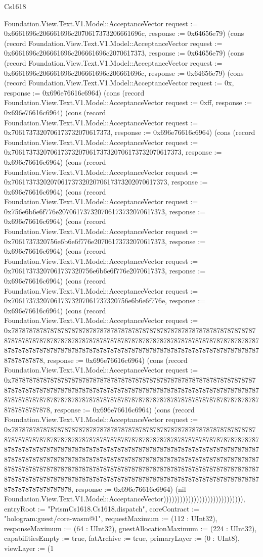 \begin{lexlean}{Cs1618}
\begin{semanticmodule}
{Foundation.View.Text.V1.Model::AcceptanceVector {request := 0x6661696c206661696c2070617373206661696c, response := 0x64656e79}) (cons (record Foundation.View.Text.V1.Model::AcceptanceVector {request := 0x6661696c206661696c206661696c2070617373, response := 0x64656e79}) (cons (record Foundation.View.Text.V1.Model::AcceptanceVector {request := 0x6661696c206661696c206661696c206661696c, response := 0x64656e79}) (cons (record Foundation.View.Text.V1.Model::AcceptanceVector {request := 0x, response := 0x696e76616c6964}) (cons (record Foundation.View.Text.V1.Model::AcceptanceVector {request := 0xff, response := 0x696e76616c6964}) (cons (record Foundation.View.Text.V1.Model::AcceptanceVector {request := 0x7061737320706173732070617373, response := 0x696e76616c6964}) (cons (record Foundation.View.Text.V1.Model::AcceptanceVector {request := 0x706173732070617373207061737320706173732070617373, response := 0x696e76616c6964}) (cons (record Foundation.View.Text.V1.Model::AcceptanceVector {request := 0x70617373202070617373202070617373202070617373, response := 0x696e76616c6964}) (cons (record Foundation.View.Text.V1.Model::AcceptanceVector {request := 0x756e6b6e6f776e207061737320706173732070617373, response := 0x696e76616c6964}) (cons (record Foundation.View.Text.V1.Model::AcceptanceVector {request := 0x7061737320756e6b6e6f776e20706173732070617373, response := 0x696e76616c6964}) (cons (record Foundation.View.Text.V1.Model::AcceptanceVector {request := 0x70617373207061737320756e6b6e6f776e2070617373, response := 0x696e76616c6964}) (cons (record Foundation.View.Text.V1.Model::AcceptanceVector {request := 0x706173732070617373207061737320756e6b6e6f776e, response := 0x696e76616c6964}) (cons (record Foundation.View.Text.V1.Model::AcceptanceVector {request := 0x78787878787878787878787878787878787878787878787878787878787878787878787878787878787878787878787878787878787878787878787878787878787878787878787878787878787878787878787878787878787878787878787878787878787878787878787878787878, response := 0x696e76616c6964}) (cons (record Foundation.View.Text.V1.Model::AcceptanceVector {request := 0x7878787878787878787878787878787878787878787878787878787878787878787878787878787878787878787878787878787878787878787878787878787878787878787878787878787878787878787878787878787878787878787878787878787878787878787878787878787878, response := 0x696e76616c6964}) (cons (record Foundation.View.Text.V1.Model::AcceptanceVector {request := 0x7878787878787878787878787878787878787878787878787878787878787878787878787878787878787878787878787878787878787878787878787878787878787878787878787878787878787878787878787878787878787878787878787878787878787878787878787878787878787878787878787878787878787878787878787878787878787878787878787878787878787878787878787878787878787878787878787878787878787878787878787878787878787878787878787878787878787878787878787878787878787878787878787878787878787878, response := 0x696e76616c6964}) (nil Foundation.View.Text.V1.Model::AcceptanceVector))))))))))))))))))))))))))))), entryRoot := "PrismCs1618.Cs1618.dispatch", coreContract := "hologram:guest/core-wasm@1", requestMaximum := (112 : UInt32), responseMaximum := (64 : UInt32), guestAllocationMaximum := (224 : UInt32), capabilitiesEmpty := true, fatArchive := true, primaryLayer := (0 : UInt8), viewLayer := (1 }
\end{semanticmodule}
\end{lexlean}

